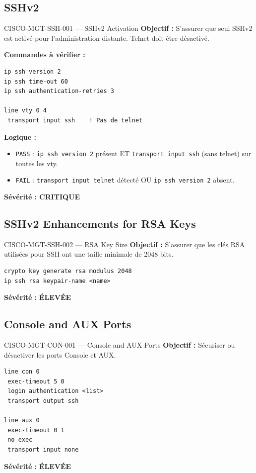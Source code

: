 \documentclass[12pt, a4paper]{report}
\begin{document}
\subsection{SSHv2}

\begin{rulebox}{CISCO-MGT-SSH-001 — SSHv2 Activation}
  \textbf{Objectif :} S'assurer que seul SSHv2 est activé pour l'administration distante. Telnet doit être désactivé.

  \textbf{Commandes à vérifier :}
  \begin{lstlisting}
ip ssh version 2
ip ssh time-out 60
ip ssh authentication-retries 3

line vty 0 4
 transport input ssh    ! Pas de telnet
  \end{lstlisting}

  \textbf{Logique :}
  \begin{itemize}
    \item \texttt{PASS} : \texttt{ip ssh version 2} présent ET \texttt{transport input ssh} (sans telnet) sur toutes les vty.
    \item \texttt{FAIL} : \texttt{transport input telnet} détecté OU \texttt{ip ssh version 2} absent.
  \end{itemize}

  \textbf{Sévérité :} \textcolor{accentRed}{\textbf{CRITIQUE}}
\end{rulebox}

\subsection{SSHv2 Enhancements for RSA Keys}

\begin{rulebox}{CISCO-MGT-SSH-002 — RSA Key Size}
  \textbf{Objectif :} S'assurer que les clés RSA utilisées pour SSH ont une taille minimale de 2048 bits.

  \begin{lstlisting}
crypto key generate rsa modulus 2048
ip ssh rsa keypair-name <name>
  \end{lstlisting}

  \textbf{Sévérité :} \textcolor{accentOrange}{\textbf{ÉLEVÉE}}
\end{rulebox}

\subsection{Console and AUX Ports}

\begin{rulebox}{CISCO-MGT-CON-001 — Console and AUX Ports}
  \textbf{Objectif :} Sécuriser ou désactiver les ports Console et AUX.

  \begin{lstlisting}
line con 0
 exec-timeout 5 0
 login authentication <list>
 transport output ssh

line aux 0
 exec-timeout 0 1
 no exec
 transport input none
  \end{lstlisting}

  \textbf{Sévérité :} \textcolor{accentOrange}{\textbf{ÉLEVÉE}}
\end{rulebox}
\end{document}
